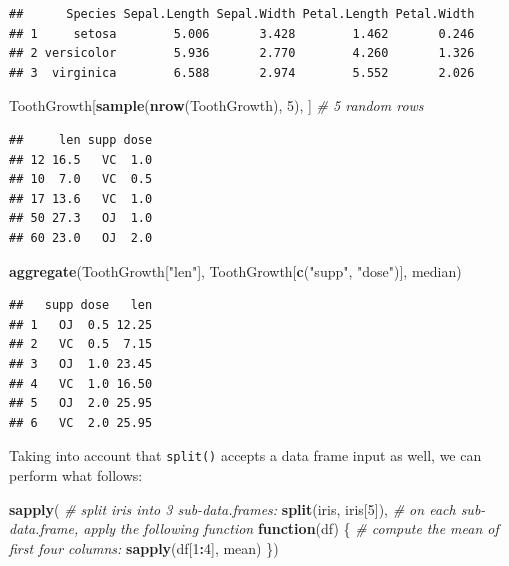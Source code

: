 \documentclass[10pt,b5paper,krantz1]{krantz}
\newenvironment{Shaded}{\begin{snugshade}}{\end{snugshade}}
\newcommand{\CommentTok}[1]{\textcolor[rgb]{0.37,0.37,0.37}{\textit{#1}}}
\newcommand{\ControlFlowTok}[1]{\textcolor[rgb]{0.27,0.27,0.27}{\textbf{#1}}}
\newcommand{\DecValTok}[1]{\textcolor[rgb]{0.06,0.06,0.06}{#1}}
\newcommand{\KeywordTok}[1]{\textcolor[rgb]{0.27,0.27,0.27}{\textbf{#1}}}
\newcommand{\NormalTok}[1]{#1}
\newcommand{\OperatorTok}[1]{\textcolor[rgb]{0.43,0.43,0.43}{\textbf{#1}}}
\newcommand{\StringTok}[1]{\textcolor[rgb]{0.5,0.5,0.5}{#1}}
\begin{document}
\begin{verbatim}
##      Species Sepal.Length Sepal.Width Petal.Length Petal.Width
## 1     setosa        5.006       3.428        1.462       0.246
## 2 versicolor        5.936       2.770        4.260       1.326
## 3  virginica        6.588       2.974        5.552       2.026
\end{verbatim}

\begin{Shaded}
\begin{Highlighting}[]
\NormalTok{ToothGrowth[}\KeywordTok{sample}\NormalTok{(}\KeywordTok{nrow}\NormalTok{(ToothGrowth), }\DecValTok{5}\NormalTok{), ] }\CommentTok{# 5 random rows}
\end{Highlighting}
\end{Shaded}

\begin{verbatim}
##     len supp dose
## 12 16.5   VC  1.0
## 10  7.0   VC  0.5
## 17 13.6   VC  1.0
## 50 27.3   OJ  1.0
## 60 23.0   OJ  2.0
\end{verbatim}

\begin{Shaded}
\begin{Highlighting}[]
\KeywordTok{aggregate}\NormalTok{(ToothGrowth[}\StringTok{"len"}\NormalTok{], ToothGrowth[}\KeywordTok{c}\NormalTok{(}\StringTok{"supp"}\NormalTok{, }\StringTok{"dose"}\NormalTok{)], median)}
\end{Highlighting}
\end{Shaded}

\begin{verbatim}
##   supp dose   len
## 1   OJ  0.5 12.25
## 2   VC  0.5  7.15
## 3   OJ  1.0 23.45
## 4   VC  1.0 16.50
## 5   OJ  2.0 25.95
## 6   VC  2.0 25.95
\end{verbatim}

Taking into account that \texttt{split()} accepts a data frame input as well,
we can perform what follows:

\begin{Shaded}
\begin{Highlighting}[]
\KeywordTok{sapply}\NormalTok{(}
    \CommentTok{# split iris into 3 sub-data.frames:}
    \KeywordTok{split}\NormalTok{(iris, iris[}\DecValTok{5}\NormalTok{]),}
    \CommentTok{# on each sub-data.frame, apply the following function}
    \ControlFlowTok{function}\NormalTok{(df) \{}
        \CommentTok{# compute the mean of first four columns:}
        \KeywordTok{sapply}\NormalTok{(df[}\DecValTok{1}\OperatorTok{:}\DecValTok{4}\NormalTok{], mean)}
\NormalTok{    \})}
\end{Highlighting}
\end{Shaded}
\end{document}

